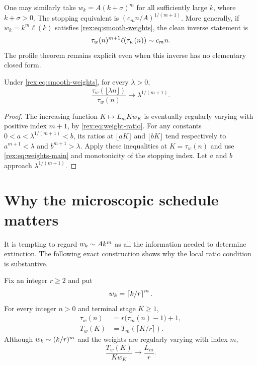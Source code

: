 One may similarly take $w_k=A(k+\sigma)^m$ for all sufficiently large
$k$, where $k+\sigma>0$. The stopping equivalent is
$(c_m n/A)^{1/(m+1)}$. More generally, if
$w_k=k^m\ell(k)$ satisfies \cref{rex:eq:smooth-weights}, the clean inverse
statement is
\[
 \tau_w(n)^{m+1}\ell(\tau_w(n))\mathrel{\sim} c_m n.
\]
The profile theorem remains explicit even when this inverse has no
elementary closed form.

\begin{corollary}\label{rex:cor:inverse-rv}
Under \cref{rex:eq:smooth-weights}, for every $\lambda>0$,
\[
 \frac{\tau_w(\lfloor\lambda n\rfloor)}{\tau_w(n)}
 \longrightarrow\lambda^{1/(m+1)}.
\]
\end{corollary}

\begin{proof}
The increasing function $K\mapsto L_mK w_K$ is eventually regularly
varying with positive index $m+1$, by \cref{rex:eq:weight-ratio}.
For any constants $0<a<\lambda^{1/(m+1)}<b$, its ratios at
$\lfloor aK\rfloor$ and $\lfloor bK\rfloor$ tend respectively to
$a^{m+1}<\lambda$ and $b^{m+1}>\lambda$. Apply these inequalities
at $K=\tau_w(n)$ and use \cref{rex:eq:weights-main} and monotonicity of
the stopping index. Let $a$ and $b$ approach
$\lambda^{1/(m+1)}$.
\end{proof}

\section{Why the microscopic schedule matters}\label{rex:sec:clock}

It is tempting to regard $w_k\mathrel{\sim} A k^m$ as all the information needed
to determine extinction. The following exact construction shows why the
local ratio condition is substantive.

\begin{proposition}\label{rex:prop:blocks}
Fix an integer $r\geq2$ and put
\begin{equation}\label{rex:eq:block-weights}
 w_k=\left\lceil k/r\right\rceil^{m}.
\end{equation}
For every integer $n>0$ and terminal stage $K\geq1$,
\begin{align}
 \tau_w(n)&=r\bigl(\tau_m(n)-1\bigr)+1,
       \label{rex:eq:block-time}\\
 T_w(K)&=T_m(\lceil K/r\rceil).
       \label{rex:eq:block-threshold}
\end{align}
Although $w_k\mathrel{\sim}(k/r)^m$ and the weights are regularly varying
with index $m$,
\begin{equation}\label{rex:eq:block-constant}
 \frac{T_w(K)}{K w_K}\longrightarrow\frac{L_m}{r}.
\end{equation}
\end{proposition}

